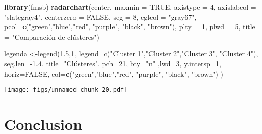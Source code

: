 \documentclass[11pt,]{article}
\newenvironment{Shaded}{\begin{snugshade}}{\end{snugshade}}
\newcommand{\KeywordTok}[1]{\textcolor[rgb]{0.13,0.29,0.53}{\textbf{#1}}}
\newcommand{\DataTypeTok}[1]{\textcolor[rgb]{0.13,0.29,0.53}{#1}}
\newcommand{\DecValTok}[1]{\textcolor[rgb]{0.00,0.00,0.81}{#1}}
\newcommand{\StringTok}[1]{\textcolor[rgb]{0.31,0.60,0.02}{#1}}
\newcommand{\OtherTok}[1]{\textcolor[rgb]{0.56,0.35,0.01}{#1}}
\newcommand{\NormalTok}[1]{#1}
\begin{document}
\begin{Shaded}
\begin{Highlighting}[]
\KeywordTok{library}\NormalTok{(fmsb)}
\KeywordTok{radarchart}\NormalTok{(center,}
           \DataTypeTok{maxmin =} \OtherTok{TRUE}\NormalTok{,}
           \DataTypeTok{axistype =} \DecValTok{4}\NormalTok{,}
           \DataTypeTok{axislabcol =} \StringTok{"slategray4"}\NormalTok{,}
           \DataTypeTok{centerzero =} \OtherTok{FALSE}\NormalTok{,}
           \DataTypeTok{seg =} \DecValTok{8}\NormalTok{,}
           \DataTypeTok{cglcol =} \StringTok{"gray67"}\NormalTok{,}
           \DataTypeTok{pcol=}\KeywordTok{c}\NormalTok{(}\StringTok{"green"}\NormalTok{,}\StringTok{"blue"}\NormalTok{,}\StringTok{"red"}\NormalTok{, }\StringTok{"purple"}\NormalTok{, }\StringTok{"black"}\NormalTok{, }\StringTok{"brown"}\NormalTok{),}
           \DataTypeTok{plty =} \DecValTok{1}\NormalTok{,}
           \DataTypeTok{plwd =} \DecValTok{5}\NormalTok{,}
           \DataTypeTok{title =} \StringTok{"Comparación de clústeres")}


\StringTok{legenda <-legend(1.5,1, legend=c("}\NormalTok{Cluster }\DecValTok{1}\StringTok{","}\NormalTok{Cluster }\DecValTok{2}\StringTok{","}\NormalTok{Cluster }\DecValTok{3}\StringTok{", "}\NormalTok{Cluster }\DecValTok{4}\StringTok{"),}
\StringTok{                 seg.len=-1.4,}
\StringTok{                 title="}\NormalTok{Clústeres",}
                 \DataTypeTok{pch=}\DecValTok{21}\NormalTok{, }
                 \DataTypeTok{bty=}\StringTok{"n"}\NormalTok{ ,}\DataTypeTok{lwd=}\DecValTok{3}\NormalTok{, }\DataTypeTok{y.intersp=}\DecValTok{1}\NormalTok{, }\DataTypeTok{horiz=}\OtherTok{FALSE}\NormalTok{,}
                 \DataTypeTok{col=}\KeywordTok{c}\NormalTok{(}\StringTok{"green"}\NormalTok{,}\StringTok{"blue"}\NormalTok{,}\StringTok{"red"}\NormalTok{, }\StringTok{"purple"}\NormalTok{, }\StringTok{"black"}\NormalTok{, }\StringTok{"brown"}\NormalTok{)}
\NormalTok{                 )}
\end{Highlighting}
\end{Shaded}

\texttt{[image: figs/unnamed-chunk-20.pdf]}

\section{Conclusion}\label{conclusion}





\newpage
\singlespacing 

\end{document}
